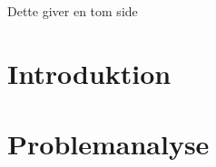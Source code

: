 

\raggedbottom



\frontmatter
%

\clearpage
\thispagestyle{empty}
{\color{white}Dette giver en tom side}
\clearpage

%

%

\tableofcontents* 

\mainmatter

\chapter{Introduktion}\vspace{-.75cm} \label{introduktion}

\chapter{Problemanalyse}\vspace{-.75cm} \label{problemanalysen}






\cleardoublepage

\begingroup
\label{litteraturliste}
\raggedright


\endgroup
\begin{appendices}
%	
%	
\end{appendices}


